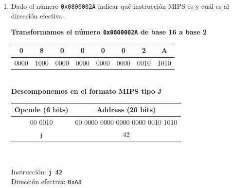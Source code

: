 \documentclass[a4paper, 11pt]{article}
\newcommand{\Pspace}{0.5cm}
\newcommand{\Aspace}{0.2cm}
\begin{document}
\begin{enumerate}
    \vspace{\Pspace}
    \item Dado el número \texttt{0x0800002A} indicar qué instrucción MIPS es y cuál es al dirección efectiva. \par
        \vspace{\Aspace} \par
        { \color{azul}  
            \textbf{Transformamos el número \texttt{0x0800002A} de base 16 a base 2} \\ 
            \begin{tabular}{|c|c|c|c|c|c|c|c|}
                \hline
                \textbf{0} & \textbf{8} & \textbf{0} & \textbf{0} & \textbf{0} & \textbf{0} & \textbf{2} & \textbf{A} \\
                \hline
                0000 & 1000 & 0000 & 0000 & 0000 & 0000 & 0010 & 1010 \\
                \hline
            \end{tabular} \\

            \textbf{Descomponemos en el formato MIPS tipo J} \\
            \begin{tabular}{|c|c|}
                \hline
                \textbf{Opcode (6 bits)} & \textbf{Address (26 bits)} \\
                \hline 
                00 0010 & 00 0000 0000 0000 0000 0010 1010 \\
                \hline
                j & 42 \\
                \hline
            \end{tabular} \\\\
            Instrucción: \texttt{j 42} \\
            Dirección efectiva: \texttt{0xA8}
        }




\end{enumerate}
\end{document}

